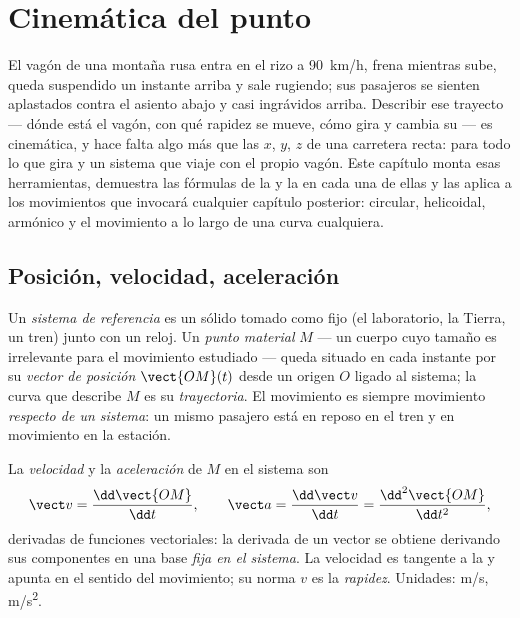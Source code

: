 \chapter{Cinemática del punto}\label{ch:b1:point-kinematics}

El vagón de una montaña rusa entra en el rizo a \qty{90}{km/h}, frena
mientras sube, queda suspendido un instante arriba y sale rugiendo; sus
pasajeros se sienten aplastados contra el asiento abajo y casi ingrávidos
arriba. Describir ese trayecto --- dónde está el vagón, con qué rapidez se
mueve, cómo gira y cambia su  --- es cinemática, y hace falta
algo más que las $x$, $y$, $z$ de una carretera recta: 
para todo lo que gira y un sistema que viaje con el propio vagón. Este
capítulo monta esas herramientas, demuestra las fórmulas de la  y
la  en cada una de ellas y las aplica a los movimientos que
invocará cualquier capítulo posterior: circular, helicoidal, armónico y el
movimiento a lo largo de una curva cualquiera.

\section{Posición, velocidad, aceleración}

\begin{definition}\label{def:b1:point-kinematics:frame}
Un \emph{sistema de referencia} es un sólido tomado como fijo (el
laboratorio, la Tierra, un tren) junto con un reloj. Un \emph{punto
material} $M$ --- un cuerpo cuyo tamaño es irrelevante para el movimiento
estudiado --- queda situado en cada instante por su \emph{vector de
posición} $\vect{OM}(t)$ desde un origen $O$ ligado al sistema; la curva
que describe $M$ es su \emph{trayectoria}. El movimiento es siempre
movimiento \emph{respecto de un sistema}: un mismo pasajero está en reposo
en el tren y en movimiento en la estación.
\end{definition}

\begin{definition}\label{def:b1:point-kinematics:velocity}
La \emph{velocidad} y la \emph{aceleración} de $M$ en el sistema son
\[
\vect v = \frac{\dd\vect{OM}}{\dd t}, \qquad
\vect a = \frac{\dd\vect v}{\dd t} = \frac{\dd^2\vect{OM}}{\dd t^2},
\]
derivadas de funciones vectoriales: la derivada de un vector se obtiene
derivando sus componentes en una base \emph{fija en el sistema}. La
velocidad es tangente a la  y apunta en el sentido del
movimiento; su norma $v$ es la \emph{rapidez}. Unidades:
\unit{m/s}, \unit{m/s^2}.
\end{definition}

